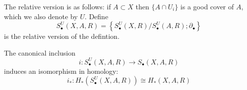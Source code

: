 The relative version is as follows: if $A\subset X$ then $\{A\cap U_i\}$ is a good cover of $A$, which we also denote by $U$. Define 
\begin{equation*}
    S_\bullet^U(X,A,R)=\left\{S_\bullet^U(X,R)/S_\bullet^U(A,R);\partial_\bullet\right\}
\end{equation*}
is the relative version of the defintion.
\begin{prop}
    The canonical inclusion 
    \begin{equation*}
        i: S_\bullet^U(X,A,R)\to S_\bullet(X,A,R)
    \end{equation*}
    induces an isomorphism in homology:
    \begin{equation*}
        i_*: H_*(S_\bullet^U(X,A,R))\cong H_*(X,A,R)
    \end{equation*}
\end{prop}
